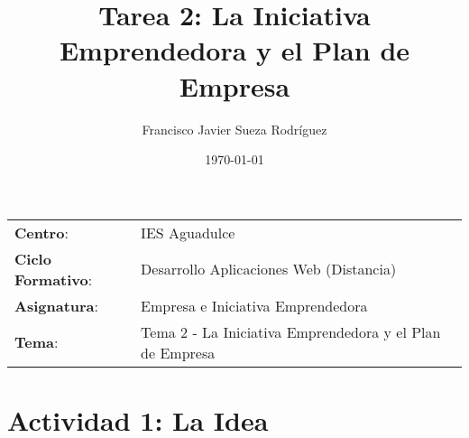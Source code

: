 


\title{
\vspace{10ex}
\normalfont \normalsize
\huge \textbf{Tarea 2: La Iniciativa Emprendedora y el Plan de Empresa}
}
\author{Francisco Javier Sueza Rodríguez}
\date{\normalsize\today}



\maketitle

\thispagestyle{empty}

\vspace{65ex}

\begin{center}
    \begin{tabular}{l l}
        \textbf{Centro}: & IES Aguadulce \\
        \textbf{Ciclo Formativo}: & Desarrollo Aplicaciones Web (Distancia)\\
        \textbf{Asignatura}: & Empresa e Iniciativa Emprendedora\\
        \textbf{Tema}: & Tema 2 -  La Iniciativa Emprendedora y el Plan de Empresa\\
    \end{tabular}
\end{center}

\newpage

\section{Actividad 1: La Idea}



%
%

